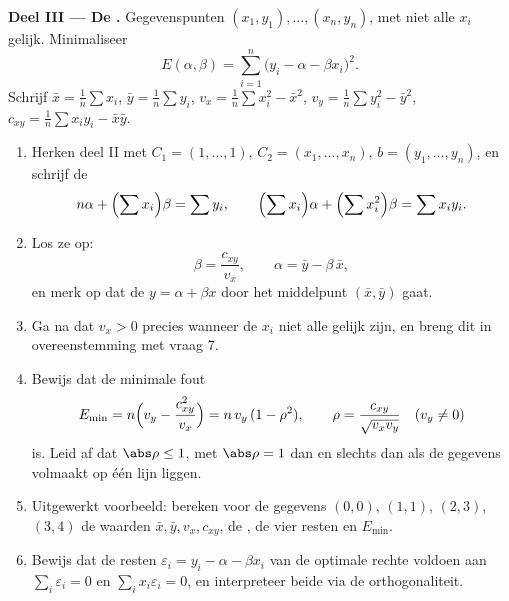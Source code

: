 \begin{problem}
\medskip
\noindent\textbf{Deel III --- De .}
Gegevenspunten $(x_1, y_1), \dots, (x_n, y_n)$, met niet alle $x_i$
gelijk. Minimaliseer
\[
E(\alpha, \beta) = \sum_{i=1}^{n}\bigl(y_i - \alpha - \beta
x_i\bigr)^2 .
\]
Schrijf $\bar x = \frac1n\sum x_i$, $\bar y = \frac1n\sum y_i$, $v_x
= \frac1n\sum x_i^2 - \bar x^2$, $v_y = \frac1n\sum y_i^2 - \bar
y^2$, $c_{xy} = \frac1n\sum x_i y_i - \bar x\bar y$.
\begin{enumerate}[resume]
  \item Herken deel II met $C_1 = (1, \dots, 1)$, $C_2 = (x_1,
        \dots, x_n)$, $b = (y_1, \dots, y_n)$, en schrijf de
        \[
        n\alpha + \Bigl(\sum x_i\Bigr)\beta = \sum y_i,
        \qquad
        \Bigl(\sum x_i\Bigr)\alpha + \Bigl(\sum
        x_i^2\Bigr)\beta = \sum x_i y_i .
        \]
  \item Los ze op:
        \[
        \beta = \frac{c_{xy}}{v_x},
        \qquad
        \alpha = \bar y - \beta\,\bar x ,
        \]
        en merk op dat de \emph{} $y = \alpha +
        \beta x$ door het middelpunt $(\bar x, \bar y)$ gaat.
  \item Ga na dat $v_x > 0$ precies wanneer de $x_i$ niet alle
        gelijk zijn, en breng dit in overeenstemming met vraag 7.
  \item Bewijs dat de minimale fout
        \[
        E_{\min} = n\Bigl(v_y - \frac{c_{xy}^2}{v_x}\Bigr)
        = n\,v_y\,(1 - \rho^2),
        \qquad
        \rho = \frac{c_{xy}}{\sqrt{v_x v_y}}
        \quad (v_y \neq 0)
        \]
        is. Leid af dat $\abs\rho \leq 1$, met $\abs\rho = 1$ dan
        en slechts dan als de gegevens volmaakt op één lijn
        liggen.
  \item Uitgewerkt voorbeeld: bereken voor de gegevens $(0,0)$,
        $(1,1)$, $(2,3)$, $(3,4)$ de waarden $\bar x, \bar y, v_x,
        c_{xy}$, de , de vier resten en
        $E_{\min}$.
  \item Bewijs dat de resten $\varepsilon_i = y_i - \alpha - \beta
        x_i$ van de optimale rechte voldoen aan $\sum_i
        \varepsilon_i = 0$ en $\sum_i x_i\varepsilon_i = 0$, en
        interpreteer beide via de orthogonaliteit.
\end{enumerate}


\end{problem}
